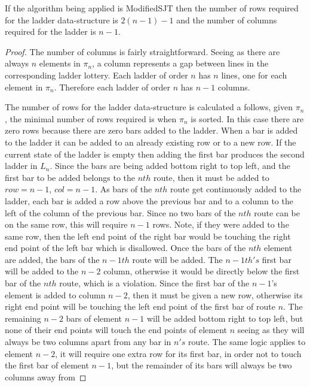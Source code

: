 \begin{theorem}
  If the algorithm being applied is {\sc ModifiedSJT} then the number of rows required for the ladder data-structure is $2(n-1) - 1$ 
  and the number of columns required for the ladder is $n-1$.
\end{theorem}
\begin{proof}
  The number of columns is fairly straightforward. Seeing as there are always $n$ elements in $\pi_{n}$, 
  a column represents a gap between lines in the corresponding ladder lottery. Each ladder of order $n$ has $n$ lines, 
  one for each element in $\pi_{n}$. Therefore each ladder of order $n$ has $n-1$ columns.\par 
  The number of rows for the ladder data-structure is calculated a follows, given $\pi_{n}$, the minimal 
  number of rows required is when $\pi_{n}$ is sorted. In this case there are zero rows because there are 
  zero bars added to the ladder. When a bar is added to the ladder it can be added to an already existing row 
  or to a new row. If the current state of the ladder is empty then adding the first bar produces the second ladder in
  $L_{n}$. Since the bars are being added bottom right to top left, and the first bar to be added belongs 
  to the $nth$ route, then it must be added to $row=n-1$, $col=n-1$. As bars of the $nth$ route get 
  continuously added to the ladder, each bar is added a row above the previous bar and to a column 
  to the left of the column of the previous bar.
  Since no two bars of the $nth$ route can be on the same row, this will require $n-1$ rows. Note, if they were added to the same 
  row, then the left end point of the right bar would be touching the right end point of the left bar which is disallowed. Once the 
  bars of the $nth$ element are added, the bars of the $n-1th$ route will be added. The $n-1th's$ first bar 
  will be added to the $n-2$ column, otherwise it would be directly below the first bar of the $nth$ route, which is a violation. 
  Since the first bar of the $n-1$'s element is added to column $n-2$, then it must be given a new row, otherwise its right end point 
  will be touching  the left end point of the first bar of route $n$. The remaining $n-2$ bars of element $n-1$
  will be added bottom right to top left, but none of their end points will touch the end points of element $n$ seeing as they will 
  always be two columns apart from any bar in $n's$ route. The same logic applies to element $n-2$, it will require one extra row for its 
  first bar, in order not to touch the first bar of element $n-1$, but the remainder of its bars will always be two columns away from 

\end{proof}
